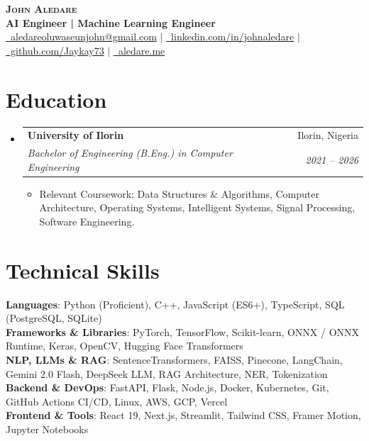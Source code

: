 \documentclass[letterpaper,11pt]{article}
\makeatletter
\newcommand{\resumeItem}[1]{
  \item\small{
    {#1 \vspace{-2pt}}
  }
}
\newcommand{\resumeSubheading}[4]{
  \vspace{-2pt}\item
    \begin{tabular*}{0.97\textwidth}[t]{l@{\extracolsep{\fill}}r}
      \textbf{#1} & #2 \\
      \textit{\small#3} & \textit{\small #4} \\
    \end{tabular*}\vspace{-7pt}
}
\newcommand{\resumeSubHeadingListStart}{\begin{itemize}[leftmargin=0.15in, label={}]}
\newcommand{\resumeSubHeadingListEnd}{\end{itemize}}
\newcommand{\resumeItemListStart}{\begin{itemize}}
\newcommand{\resumeItemListEnd}{\end{itemize}\vspace{-5pt}}
\makeatother
\begin{document}
\begin{center}
    \textbf{\Huge \scshape John Aledare} \\ \vspace{3pt}
    \small \textbf{AI Engineer | Machine Learning Engineer} \\ \vspace{2pt}
    \small \href{mailto:aledareoluwaseunjohn@gmail.com}{\faEnvelope\ aledareoluwaseunjohn@gmail.com} $|$ 
    \href{https://linkedin.com/in/johnaledare}{\faLinkedin\ linkedin.com/in/johnaledare} $|$
    \href{https://github.com/Jaykay73}{\faGithub\ github.com/Jaykay73} $|$
    \href{https://aledare.me}{\faGlobe\ aledare.me}
\end{center}

\section{Education}
  \resumeSubHeadingListStart
    \resumeSubheading
      {University of Ilorin}{Ilorin, Nigeria}
      {Bachelor of Engineering (B.Eng.) in Computer Engineering}{2021 -- 2026}
      \resumeItemListStart
        \resumeItem{Relevant Coursework: Data Structures \& Algorithms, Computer Architecture, Operating Systems, Intelligent Systems, Signal Processing, Software Engineering.}
      \resumeItemListEnd
  \resumeSubHeadingListEnd

\section{Technical Skills}
 \begin{itemize}[leftmargin=0.15in, label={}]
    \small{\item{
     \textbf{Languages}{: Python (Proficient), C++, JavaScript (ES6+), TypeScript, SQL (PostgreSQL, SQLite)} \\
     \textbf{Frameworks \& Libraries}{: PyTorch, TensorFlow, Scikit-learn, ONNX / ONNX Runtime, Keras, OpenCV, Hugging Face Transformers} \\
     \textbf{NLP, LLMs \& RAG}{: SentenceTransformers, FAISS, Pinecone, LangChain, Gemini 2.0 Flash, DeepSeek LLM, RAG Architecture, NER, Tokenization} \\
     \textbf{Backend \& DevOps}{: FastAPI, Flask, Node.js, Docker, Kubernetes, Git, GitHub Actions CI/CD, Linux, AWS, GCP, Vercel} \\
     \textbf{Frontend \& Tools}{: React 19, Next.js, Streamlit, Tailwind CSS, Framer Motion, Jupyter Notebooks}
    }}
 \end{itemize}
\end{document}
